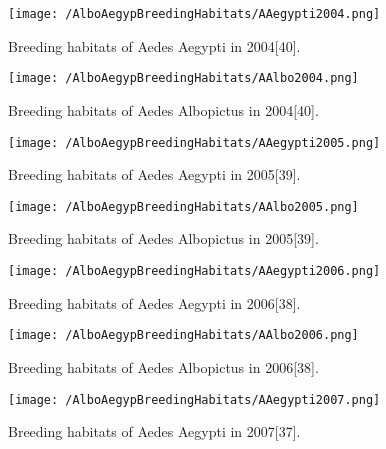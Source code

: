 \documentclass[11pt]{exam}
\begin{document}
\begin{questions}
\begin{enumerate}
\newpage
\begin{figure}[H]
  \centering
   \texttt{[image: /AlboAegypBreedingHabitats/AAegypti2004.png]} 
  \caption{Breeding habitats of Aedes Aegypti in 2004[40].}
   \label{Breeding habitats of Aedes mosquitoes}
\end{figure} 

\begin{figure}[H]
  \centering
   \texttt{[image: /AlboAegypBreedingHabitats/AAlbo2004.png]} 
  \caption{Breeding habitats of Aedes Albopictus in 2004[40].}
   \label{Breeding habitats of Aedes mosquitoes}
\end{figure} 

\newpage
\begin{figure}[H]
  \centering
   \texttt{[image: /AlboAegypBreedingHabitats/AAegypti2005.png]} 
  \caption{Breeding habitats of Aedes Aegypti in 2005[39].}
   \label{Breeding habitats of Aedes mosquitoes}
\end{figure} 

\begin{figure}[H]
  \centering
   \texttt{[image: /AlboAegypBreedingHabitats/AAlbo2005.png]} 
  \caption{Breeding habitats of Aedes Albopictus in 2005[39].}
   \label{Breeding habitats of Aedes mosquitoes}
\end{figure} 

\newpage
\begin{figure}[H]
  \centering
   \texttt{[image: /AlboAegypBreedingHabitats/AAegypti2006.png]} 
  \caption{Breeding habitats of Aedes Aegypti in 2006[38].}
   \label{Breeding habitats of Aedes mosquitoes}
\end{figure} 

\begin{figure}[H]
  \centering
   \texttt{[image: /AlboAegypBreedingHabitats/AAlbo2006.png]} 
  \caption{Breeding habitats of Aedes Albopictus in 2006[38].}
   \label{Breeding habitats of Aedes mosquitoes}
\end{figure} 

\newpage
\begin{figure}[H]
  \centering
   \texttt{[image: /AlboAegypBreedingHabitats/AAegypti2007.png]} 
  \caption{Breeding habitats of Aedes Aegypti in 2007[37].}
   \label{Breeding habitats of Aedes mosquitoes}
\end{figure} 


\end{enumerate}
\end{questions}
\end{document}
